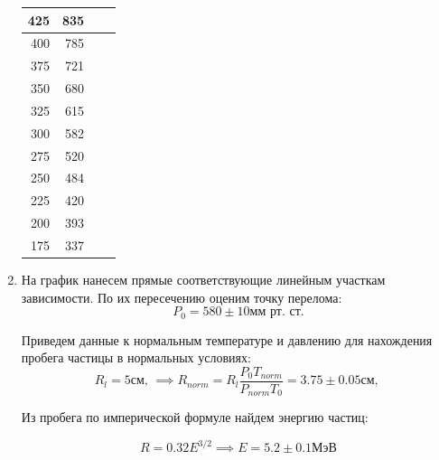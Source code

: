 \documentclass[a4paper, 12pt]{article}
\begin{document}
\begin{enumerate}
\begin{minipage}{0.5\textwidth}
\begin{tabular}{|r|r|r|r|}
                425                                 & 835                          &                                    &                              \\ \hline
                400                                 & 785                          &                                    &                              \\ \hline
                375                                 & 721                          &                                    &                              \\ \hline
                350                                 & 680                          &                                    &                              \\ \hline
                325                                 & 615                          &                                    &                              \\ \hline
                300                                 & 582                          &                                    &                              \\ \hline
                275                                 & 520                          &                                    &                              \\ \hline
                250                                 & 484                          &                                    &                              \\ \hline
                225                                 & 420                          &                                    &                              \\ \hline
                200                                 & 393                          &                                    &                              \\ \hline
                175                                 & 337                          &                                    &                              \\ \hline
                \end{tabular}
		\end{minipage}
		
		
	\item На график нанесем прямые соответствующие линейным участкам зависимости.
	По их пересечению оценим точку перелома:
	$$P_{0} = 580 \pm 10 \text{мм рт. ст.}$$
	
	Приведем данные к нормальным температуре и давлению для нахождения пробега частицы в нормальных условиях:
	$$R_l = 5\text{см, } \implies R_{norm} = R_l\frac{P_0T_{norm}}{P_{norm}T_0} = 3.75 \pm 0.05\text{см, }$$
	
	Из пробега по имперической формуле найдем энергию частиц:
	
	$$R = 0.32 E^{3/2} \implies E = 5.2 \pm 0.1\text{МэВ}$$

	\end{enumerate}
	
\end{document}
